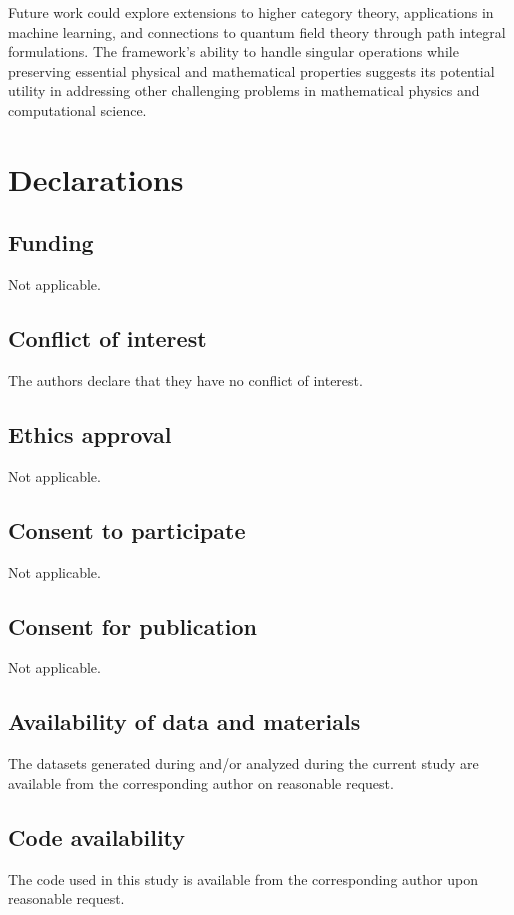 \documentclass[sn-mathphys-num]{sn-jnl}
\theoremstyle{thmstyleone}
\theoremstyle{thmstyletwo}
\theoremstyle{thmstylethree}
\begin{document}
Future work could explore extensions to higher category theory, applications in machine learning, and connections to quantum field theory through path integral formulations. The framework's ability to handle singular operations while preserving essential physical and mathematical properties suggests its potential utility in addressing other challenging problems in mathematical physics and computational science.
\section*{Declarations}

\subsection*{Funding}
Not applicable.

\subsection*{Conflict of interest}
The authors declare that they have no conflict of interest.

\subsection*{Ethics approval}
Not applicable.

\subsection*{Consent to participate}
Not applicable.

\subsection*{Consent for publication}
Not applicable.

\subsection*{Availability of data and materials}
The datasets generated during and/or analyzed during the current study are available from the corresponding author on reasonable request.

\subsection*{Code availability}
The code used in this study is available from the corresponding author upon reasonable request.
\end{document}
